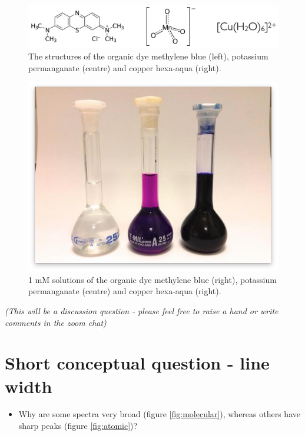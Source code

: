\documentclass[
]{book}
\providecommand{\tightlist}{%
  \setlength{\itemsep}{0pt}\setlength{\parskip}{0pt}}
\begin{document}
\begin{figure}

{\centering \includegraphics[width=0.7\linewidth]{images/molarextquestion} 

}

\caption{The structures of the organic dye methylene blue (left), potassium permanganate (centre) and copper hexa-aqua (right).}\label{fig:molarextstructures}
\end{figure}

\begin{figure}

{\centering \includegraphics[width=0.7\linewidth]{images/Molar_extinction_coefficients} 

}

\caption{1 mM solutions of the organic dye methylene blue (right), potassium permanganate (centre) and copper hexa-aqua (right).}\label{fig:molarextsolutions}
\end{figure}

\emph{(This will be a discussion question - please feel free to raise a hand or write comments in the zoom chat)}

\hypertarget{sec:linewidth}{%
\section{Short conceptual question - line width}\label{sec:linewidth}}

\begin{itemize}
\tightlist
\item
  Why are some spectra very broad (figure \ref{fig:molecular}), whereas others have sharp peaks (figure \ref{fig:atomic})?
\end{itemize}
\end{document}
